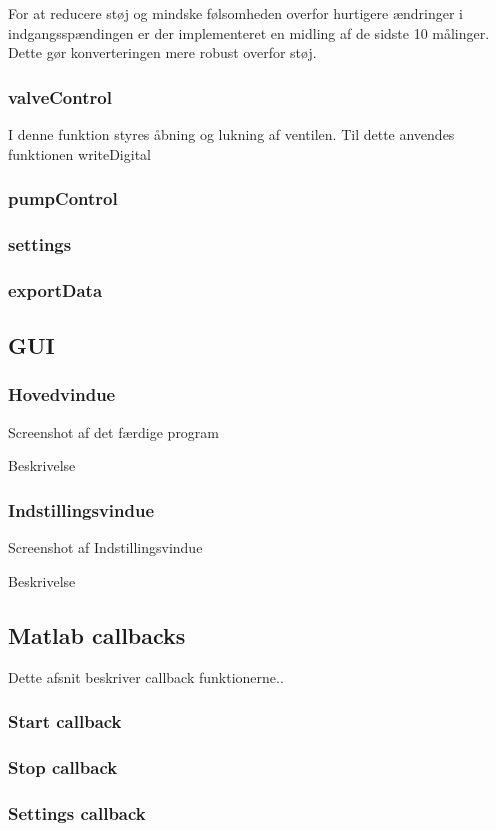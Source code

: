 For at reducere støj og mindske følsomheden overfor hurtigere ændringer i indgangsspændingen er der implementeret en midling af de sidste 10 målinger. Dette gør konverteringen mere robust overfor støj.  


\subsubsection{valveControl}
I denne funktion styres åbning og lukning af ventilen. Til dette anvendes funktionen writeDigital
\subsubsection{pumpControl}

\subsubsection{settings}
\subsubsection{exportData}

\newpage
\subsection{GUI}
\subsubsection{Hovedvindue}
Screenshot af det færdige program

Beskrivelse
\subsubsection{Indstillingsvindue}
Screenshot af Indstillingsvindue

Beskrivelse

\newpage
\subsection{Matlab callbacks}
Dette afsnit beskriver callback funktionerne..
\subsubsection{Start callback}

\subsubsection{Stop callback}

\subsubsection{Settings callback}